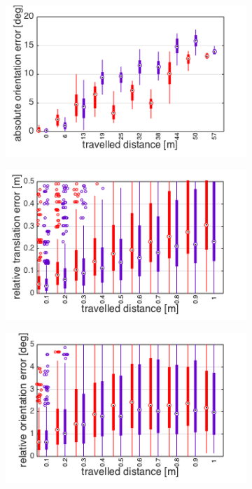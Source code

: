 \begin{figure}[h]
\begin{subfigure}[b]{0.42\textwidth}
    \caption{}
  \end{subfigure}
  \begin{subfigure}[b]{0.42\textwidth}
    \includegraphics[width=\textwidth]{images/fast_fixed/fast_fixed_aoe.png}
    \caption{}
  \end{subfigure}
  \hfill
  \begin{subfigure}[b]{0.42\textwidth}
    \includegraphics[width=\textwidth]{images/fast_fixed/fast_fixed_rte.png}
    \caption{}
  \end{subfigure}
  \hfill
  \begin{subfigure}[b]{0.42\textwidth}
    \includegraphics[width=\textwidth]{images/fast_fixed/fast_fixed_roe.png}

\end{subfigure}
\end{figure}
